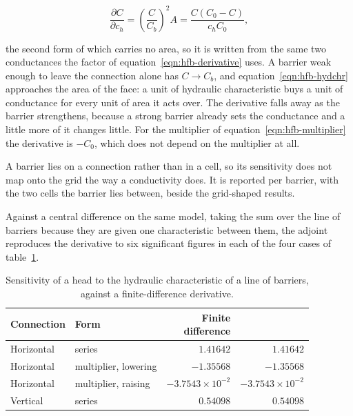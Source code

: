 \begin{equation}
	\label{eqn:hfb-hydchr}
	\frac{\partial C}{\partial c_{h}} =
	\left( \frac{C}{C_{b}} \right)^{2} A =
	\frac{C \left( C_{0} - C \right)}{c_{h} C_{0}},
\end{equation}

\noindent the second form of which carries no area, so it is written from the same two conductances the factor of equation~\ref{eqn:hfb-derivative} uses. A barrier weak enough to leave the connection alone has $C \rightarrow C_{b}$, and equation~\ref{eqn:hfb-hydchr} approaches the area of the face: a unit of hydraulic characteristic buys a unit of conductance for every unit of area it acts over. The derivative falls away as the barrier strengthens, because a strong barrier already sets the conductance and a little more of it changes little. For the multiplier of equation~\ref{eqn:hfb-multiplier} the derivative is $-C_{0}$, which does not depend on the multiplier at all.

A barrier lies on a connection rather than in a cell, so its sensitivity does not map onto the grid the way a conductivity does. It is reported per barrier, with the two cells the barrier lies between, beside the grid-shaped results.

Against a central difference on the same model, taking the sum over the line of barriers because they are given one characteristic between them, the adjoint reproduces the derivative to six significant figures in each of the four cases of table~\ref{tab:hfb-hydchr}.

\begin{table}[htb]
	\centering
	\caption{Sensitivity of a head to the hydraulic characteristic of a line of
	barriers, against a finite-difference derivative.}
	\label{tab:hfb-hydchr}
	\small
	\begin{tabular}{llrr}
		\toprule
		Connection & Form &
		\shortstack[r]{Finite\\difference} &
		\shortstack[r]{Adjoint} \\
		\midrule
		Horizontal & series               & $1.41642$              & $1.41642$ \\
		Horizontal & multiplier, lowering & $-1.35568$             & $-1.35568$ \\
		Horizontal & multiplier, raising  & $-3.7543 \times 10^{-2}$ & $-3.7543 \times 10^{-2}$ \\
		Vertical   & series               & $0.54098$              & $0.54098$ \\
		\bottomrule
	\end{tabular}
\end{table}

